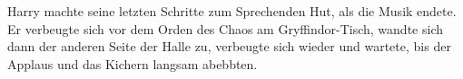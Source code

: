 Harry machte seine letzten Schritte zum Sprechenden Hut, als die Musik endete. Er verbeugte sich vor dem Orden des Chaos am Gryffindor-Tisch, wandte sich dann der anderen Seite der Halle zu, verbeugte sich wieder und wartete, bis der Applaus und das Kichern langsam abebbten.









